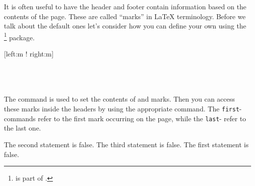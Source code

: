 It is often useful to have the header and footer contain information based on
the contents of the page. These are called \enquote{marks} in \LaTeX{}
terminology. Before we talk about the default ones let's consider how you can
define your own using the \footnote{ is part
  of .} package.
\begin{lscommand}
  [left:m ! right:m] \\
   \\
   \\
   \\
\end{lscommand}
The  command is used to set the contents of  and 
marks. Then you can access these marks inside the headers by using the appropriate
command. The \texttt{first}- commands refer to the first mark occurring on the
page, while the \texttt{last}- refer to the last one.
\begin{example}[standalone, paperheight=4cm]
\geometry{includehead, includefoot, headsep=.5em, footskip=1em} %
\sloppy %
\usepackage{fancyhdr}%
\usepackage{extramarks}
\pagestyle{fancy}%

\fancyhead[L]{\firstleftxmark}
\fancyhead[R]{\lastleftxmark}
\fancyfoot[L]{\firstrightxmark}
\fancyfoot[R]{\lastrightxmark}

\noindent %
The second statement is false.
The third statement is false.
The first statement is false.
\end{example}


